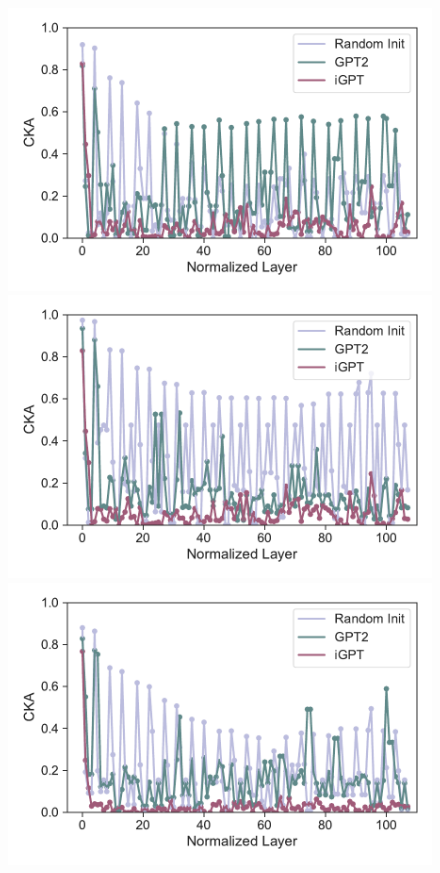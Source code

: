 \documentclass{article}
\begin{document}
\begin{figure}[H]
    \centering
    \begin{minipage}[b]{0.32\linewidth}
        \includegraphics[width=\linewidth]{figs/cka_plot_40_gpt2_igpt_dt_hopper_medium_42_reward.pdf}
    \end{minipage}
    \begin{minipage}[b]{0.32\linewidth}
        \includegraphics[width=\linewidth]{figs/cka_plot_40_gpt2_igpt_dt_halfcheetah_medium_42_reward.pdf}
    \end{minipage}
    \begin{minipage}[b]{0.32\linewidth}
        \includegraphics[width=\linewidth]{figs/cka_plot_40_gpt2_igpt_dt_walker2d_medium_42_reward.pdf}

\end{minipage}
\end{figure}
\end{document}
